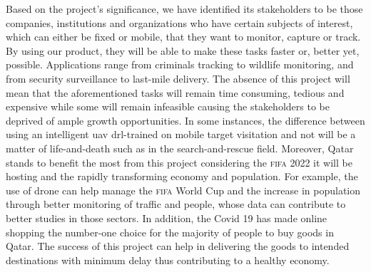\documentclass[../main.tex]{subfiles}
\begin{document}
Based on the project's significance, we have identified 
its stakeholders to be 
those companies, institutions and organizations who
have certain subjects of interest, 
which can either be fixed or mobile,
that they want to monitor, capture or track.
By using our product,
they will be able to make these tasks faster or,
better yet, possible.
Applications range from criminals tracking 
to wildlife monitoring,
and from security surveillance
to last-mile delivery.
The absence of this project will mean that
the aforementioned tasks will remain
time consuming, tedious and expensive
while some will remain infeasible
causing the stakeholders to be deprived of ample growth opportunities.
In some instances, the difference between using 
an intelligent \gls{uav} \gls{drl}-trained on mobile target visitation
and not
will be a matter of life-and-death
such as in the search-and-rescue field.
Moreover, Qatar stands to benefit the most from this project 
considering the \textsc{fifa} 2022 it will be hosting
and the rapidly transforming economy and population.
For example, the use of drone can help manage 
the \textsc{fifa} World Cup 
and the increase in population through better monitoring 
of traffic and people, whose data can contribute
to better studies in those sectors.
In addition, the Covid 19 has made online shopping
the number-one choice for the majority of people to buy goods in Qatar.
The success of this project can help in delivering
the goods to intended destinations with minimum delay
thus contributing to a healthy economy.



\end{document}
